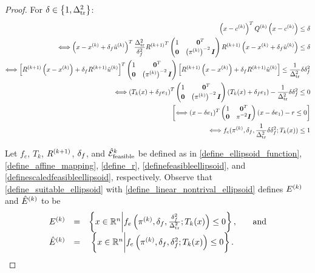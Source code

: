 \documentclass{article}
\begin{document}
\begin{proof}

\color{magenta}
For $\delta \in \left\{1, \Delta_{\textrm{tr}}^2\right\}$:
\begin{align*}
\left(x - c^{(k)}\right)^T{Q^{(k)}}\left(x - c^{(k)}\right) \le \delta \\
\Longleftrightarrow
\left(x - x^{(k)}+\delta_{f} {{{\hat u}^{(k)}}} \right)^T\frac {\Delta_{\textrm{tr}}^2} {\delta_f^2} {R^{(k+1)}}^T \begin{pmatrix}
1 & \boldsymbol0^T \\
\boldsymbol 0 & \left({\pi^{(k)}}\right)^{-2} \boldsymbol I \\
\end{pmatrix} {R^{(k+1)}}\left(x - x^{(k)}+\delta_{f} {{{\hat u}^{(k)}}} \right) \le \delta \\
\Longleftrightarrow
\left[{R^{(k+1)}}\left(x - x^{(k)}\right)+\delta_{f} {R^{(k+1)}} {{{\hat u}^{(k)}}} \right]^T \begin{pmatrix}
1 & \boldsymbol0^T \\
\boldsymbol 0 & \left({\pi^{(k)}}\right)^{-2} \boldsymbol I \\
\end{pmatrix} \left[{R^{(k+1)}}\left(x - x^{(k)}\right)+\delta_{f} {R^{(k+1)}} {{{\hat u}^{(k)}}} \right] \le \frac 1 {\Delta_{\textrm{tr}}^2} \delta\delta_f^2 \\
\Longleftrightarrow
\left(T_k(x) + \delta_{f} e_1 \right)^T \begin{pmatrix}
1 & \boldsymbol0^T \\
\boldsymbol 0 & \left({\pi^{(k)}}\right)^{-2} \boldsymbol I \\
\end{pmatrix} \left(T_k(x) + \delta_{f} e_1 \right) - \frac 1 {\Delta_{\textrm{tr}}^2} \delta\delta_f^2 \le 0\\
\left[
\Longleftrightarrow (x - \delta e_1)^T
\begin{pmatrix}
1 & \boldsymbol0^T \\
\boldsymbol 0 & \pi^{-2} \boldsymbol I \\
\end{pmatrix}
(x - \delta e_1) - r \le 0 \right]\\
\Longleftrightarrow f_{e}(\pi^{(k)}, \delta_{f},\frac 1 {\Delta_{\textrm{tr}}^2} \delta\delta_f^2; T_k(x)) \le 1
\end{align*}

\color{black}

Let 
$f_e$,
$T_k$,
${R^{(k+1)}}$, $\delta_{f}$, and ${{\mathcal {\hat E}_{\text{feasible}}}^k}$
be defined as in
\cref{define_ellipsoid_function},
\cref{define_affine_mapping},
\cref{define_r},
\cref{definefeasibleellipsoid}, and
\cref{definescaledfeasibleellipsoid},
respectively. 
Observe that \cref{define_suitable_ellipsoid} with \cref{define_linear_nontrival_ellipsoid} defines  ${E^{(k)}}$ and ${{\hat E}^{(k)}}$ to be
\begin{align*}
\begin{array}{cccc}
{E^{(k)}} &=& \left\{x \in \mathbb R^n \bigg | f_e\left(\pi^{(k)}, \delta_{f}, \frac {\delta_{f}^2} {\Delta_{\textrm{tr}}^2} ; T_k(x)\right) \le 0\right\}, &\quad \textrm{and}  \\
{{\hat E}^{(k)}} &=& \left\{x \in \mathbb R^n \bigg | f_e\left({\pi^{(k)}}, \delta_{f}, \delta_{f}^2; T_k(x)\right) \le 0\right\}.&
\end{array}
\end{align*}


\end{proof}
\end{document}
